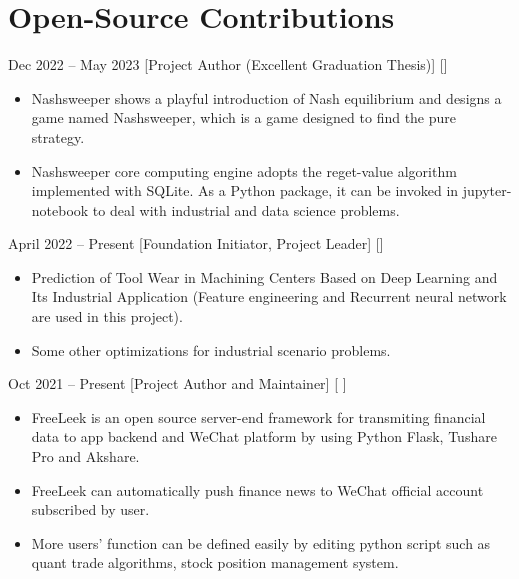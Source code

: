 \documentclass{chicv}
\begin{document}
\section{Open-Source Contributions}
%
%
  {Dec 2022 -- May 2023}
  [Project Author (Excellent Graduation Thesis)]
  []
  \begin{itemize}
    \item Nashsweeper shows a playful introduction of Nash equilibrium and designs a game named Nashsweeper, which is a game designed to find the pure strategy.  
    \item Nashsweeper core computing engine adopts the reget-value algorithm implemented with SQLite. As a Python package, it can be invoked in jupyter- notebook to deal with industrial and data science problems.
  \end{itemize}
%
%
%
  {April 2022 -- Present}
  [Foundation Initiator, Project Leader]
  []
  \begin{itemize}
    \item Prediction of Tool Wear in Machining Centers Based on Deep Learning and Its Industrial Application (Feature engineering and Recurrent neural network are used in this project). 
    \item Some other optimizations for industrial scenario problems.
  \end{itemize}
%
%
  {Oct 2021 -- Present}
  [Project Author and Maintainer]
  [ ]
  \begin{itemize}
    \item FreeLeek is an open source server-end framework for transmiting financial data to app backend and WeChat platform by using Python Flask, Tushare Pro and Akshare.
    \item FreeLeek can automatically push finance news to WeChat official account subscribed by user.
    \item More users' function can be defined easily by editing python script such as quant trade algorithms, stock position management system.
  \end{itemize}
%
%
%
\end{document}
